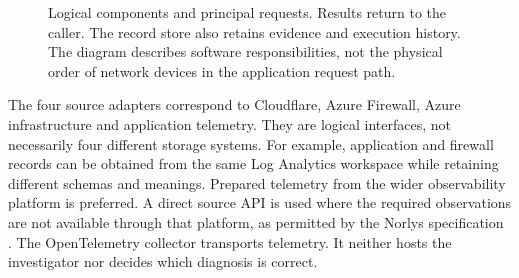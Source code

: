 \begin{figure}[htbp]
\centering
{}
\caption{Logical components and principal requests. Results return to the
caller. The record store also retains evidence and execution history.
The diagram describes software responsibilities, not the physical order
of network devices in the application request path.}
\label{fig:design:architecture}
\end{figure}

The four source adapters correspond to Cloudflare, Azure Firewall, Azure
infrastructure and application telemetry. They are logical interfaces,
not necessarily four different storage systems. For example, application
and firewall records can be obtained from the same Log Analytics workspace
while retaining different schemas and meanings. Prepared telemetry from
the wider observability platform is preferred. A direct source API is
used where the required observations are not available through that
platform, as permitted by the Norlys specification
\parencite[Relationship to the Parent Story, AC-3]{norlys_operations_agents}.
The OpenTelemetry collector transports telemetry. It neither hosts the
investigator nor decides which diagnosis is correct.

